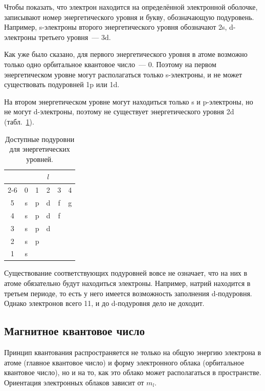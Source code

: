 Чтобы показать, что электрон находится на определённой электронной оболочке, записывают номер энергетического уровня и букву, обозначающую подуровень. Например, s-электроны второго энергетического уровня обозначают 2s, d-электроны третьего уровня~--- 3d.

Как уже было сказано, для первого энергетического уровня в атоме возможно только одно орбитальное квантовое число~--- 0. Поэтому на первом энергетическом уровне могут располагаться только s-электроны, и не может существовать подуровней 1p или 1d.

На втором энергетическом уровне могут находиться только s и p-электроны, но не могут d-электроны, поэтому не существует энергетического уровня 2d (табл.~\ref{tab:available_sublevels}).

\begin{table}[htbp]
    \small
    \centering
    \caption{Доступные подуровни для энергетических уровней.}
    \label{tab:available_sublevels}
    \begin{tabular}{cccccc}
        \hline
        {\multirow{2}{*}{$n$}} & \multicolumn{5}{c}{$l$} \\ \cline{2-6}
        & 0 & 1 & 2 & 3 & 4 \\
        \hline
        5 & s & p & d & f & g \\
        4 & s & p & d & f &   \\
        3 & s & p & d &   &   \\
        2 & s & p &   &   &   \\
        1 & s &   &   &   &   \\
        \hline
    \end{tabular}
\end{table}

Существование соответствующих подуровней вовсе не означает, что на них в атоме обязательно будут находиться электроны. Например, натрий находится в третьем периоде, то есть у него имеется возможность заполнения d-подуровня. Однако электронов всего 11, и до d-подуровня дело не доходит.

\subsection*{Магнитное квантовое число}

Принцип квантования распространяется не только на общую энергию электрона в атоме (главное квантовое число) и форму электронного облака (орбитальное квантовое число), но и на то, как это облако может располагаться в пространстве. Ориентация электронных облаков зависит от  $m_l$.


